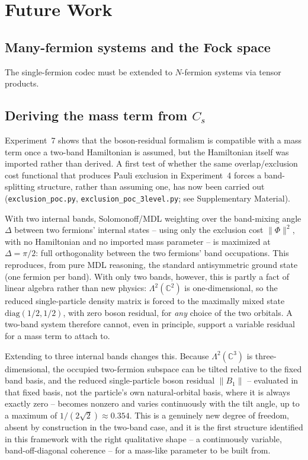 \documentclass[11pt]{article}
\begin{document}
\section{Future Work}
\label{sec:future}

\subsection{Many-fermion systems and the Fock space}

The single-fermion codec must be extended to $N$-fermion systems via tensor
products.


\subsection{Deriving the mass term from $C_s$}

Experiment~7 shows that the boson-residual formalism is compatible with a
mass term once a two-band Hamiltonian is assumed, but the Hamiltonian itself
was imported rather than derived. A first test of whether the same
overlap/exclusion cost functional that produces Pauli exclusion in
Experiment~4 forces a band-splitting structure, rather than assuming one,
has now been carried out (\texttt{exclusion\_poc.py},
\texttt{exclusion\_poc\_3level.py}; see Supplementary Material).

With two internal bands, Solomonoff/MDL weighting over the band-mixing
angle $\Delta$ between two fermions' internal states -- using only the
exclusion cost $\|\Phi\|^2$, with no Hamiltonian and no imported mass
parameter -- is maximized at $\Delta = \pi/2$: full orthogonality between
the two fermions' band occupations. This reproduces, from pure MDL
reasoning, the standard antisymmetric ground state (one fermion per band).
With only two bands, however, this is partly a fact of linear algebra
rather than new physics: $\Lambda^2(\mathbb{C}^2)$ is one-dimensional, so the
reduced single-particle density matrix is forced to the maximally mixed
state $\mathrm{diag}(1/2,1/2)$, with zero boson residual, for \emph{any}
choice of the two orbitals. A two-band system therefore cannot, even in
principle, support a variable residual for a mass term to attach to.

Extending to three internal bands changes this. Because
$\Lambda^2(\mathbb{C}^3)$ is three-dimensional, the occupied two-fermion
subspace can be tilted relative to the fixed band basis, and the reduced
single-particle boson residual $\|B_1\|$ -- evaluated in that fixed basis,
not the particle's own natural-orbital basis, where it is always exactly
zero -- becomes nonzero and varies continuously with the tilt angle, up to
a maximum of $1/(2\sqrt2) \approx 0.354$. This is a genuinely new degree of
freedom, absent by construction in the two-band case, and it is the first
structure identified in this framework with the right qualitative shape --
a continuously variable, band-off-diagonal coherence -- for a mass-like
parameter to be built from.
\end{document}
